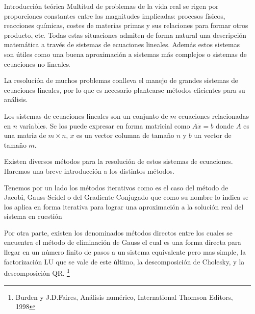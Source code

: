 \begin{section}{Introducción teórica}	
	Multitud de problemas de la vida real se rigen por proporciones constantes entre las magnitudes implicadas: procesos físicos, reacciones químicas, costes de materias primas y sus relaciones para formar otros producto, etc.
	Todas estas situaciones admiten de forma natural una descripción matemática a través de sistemas de ecuaciones lineales.
	Además estos sistemas son útiles como una buena aproximación a sistemas más complejos o sistemas de ecuaciones no-lineales.
	
	La resolución de muchos problemas conlleva el manejo de grandes sistemas de ecuaciones lineales, por lo que es necesario plantearse métodos eficientes para su análisis.
	
	Los sistemas de ecuaciones lineales son un conjunto de $m$ ecuaciones relacionadas en $n$ variables. Se los puede expresar en forma matricial como $A \dot x = b$ donde $A$ es una matriz de $m \times n$, $x$ es un vector columna de tamaño $n$ y $b$ un vector de tamaño $m$.
	
	Existen diversos métodos para la resolución de estos sistemas de ecuaciones. Haremos una breve introducción a los distintos métodos.
	
	Tenemos por un lado los métodos iterativos como es el caso del método de Jacobi, Gauss-Seidel o del Gradiente Conjugado que como su nombre lo indica se los aplica en forma iterativa para lograr una aproximación a la solución real del sistema en cuestión
	
	Por otra parte, existen los denominados métodos directos entre los cuales se encuentra el método de eliminación de Gauss el cual es una forma directa para llegar en un número finito de pasos a un sistema equivalente pero mas simple, la factorización LU que se vale de este último, la descomposición de Cholesky, y la descomposición QR.	\footnote{Burden y J.D.Faires, Análisis numérico, International Thomson Editors, 1998}
\end{section}
